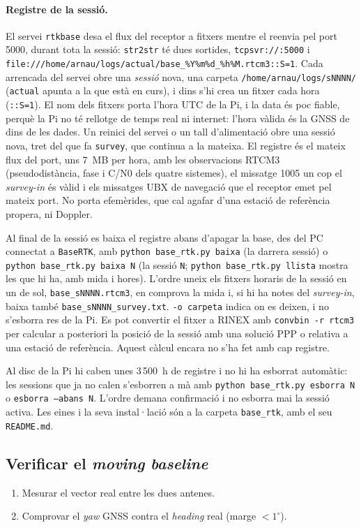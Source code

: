 \paragraph{Registre de la sessió.} El servei \texttt{rtkbase} desa el flux del receptor a fitxers mentre el reenvia pel port 5000, durant tota la sessió: \texttt{str2str} té dues sortides, \texttt{tcpsvr://:5000} i \texttt{file:///home/arnau/logs/actual/base\_\%Y\%m\%d\_\%h\%M.rtcm3::S=1}. Cada arrencada del servei obre una \emph{sessió} nova, una carpeta \texttt{/home/arnau/logs/sNNNN/} (\texttt{actual} apunta a la que està en curs), i dins s'hi crea un fitxer cada hora (\texttt{::S=1}). El nom dels fitxers porta l'hora UTC de la Pi, i la data és poc fiable, perquè la Pi no té rellotge de temps real ni internet: l'hora vàlida és la GNSS de dins de les dades. Un reinici del servei o un tall d'alimentació obre una sessió nova, tret del que fa \texttt{survey}, que continua a la mateixa. El registre és el mateix flux del port, uns 7~MB per hora, amb les observacions RTCM3 (pseudodistància, fase i C/N0 dels quatre sistemes), el missatge 1005 un cop el \emph{survey-in} és vàlid i els missatges UBX de navegació que el receptor emet pel mateix port. No porta efemèrides, que cal agafar d'una estació de referència propera, ni Doppler.

Al final de la sessió es baixa el registre abans d'apagar la base, des del PC connectat a \texttt{BaseRTK}, amb \texttt{python base\_rtk.py baixa} (la darrera sessió) o \texttt{python base\_rtk.py baixa N} (la sessió \texttt{N}; \texttt{python base\_rtk.py llista} mostra les que hi ha, amb mida i hores). L'ordre uneix els fitxers horaris de la sessió en un de sol, \texttt{base\_sNNNN.rtcm3}, en comprova la mida i, si hi ha notes del \emph{survey-in}, baixa també \texttt{base\_sNNNN\_survey.txt}. \texttt{-o carpeta} indica on es deixen, i no s'esborra res de la Pi. Es pot convertir el fitxer a RINEX amb \texttt{convbin -r rtcm3} per calcular a posteriori la posició de la sessió amb una solució PPP o relativa a una estació de referència. Aquest càlcul encara no s'ha fet amb cap registre.

Al disc de la Pi hi caben unes 3\,500~h de registre i no hi ha esborrat automàtic: les sessions que ja no calen s'esborren a mà amb \texttt{python base\_rtk.py esborra N} o \texttt{esborra --abans N}. L'ordre demana confirmació i no esborra mai la sessió activa. Les eines i la seva instal·lació són a la carpeta \texttt{base\_rtk}, amb el seu \texttt{README.md}.

\subsection{Verificar el \emph{moving baseline}}
\begin{enumerate}[label=\alph*)]
    \item Mesurar el vector real entre les dues antenes.
    \item Comprovar el \emph{yaw} GNSS contra el \emph{heading} real (marge $< 1^{\circ}$).
\end{enumerate}

